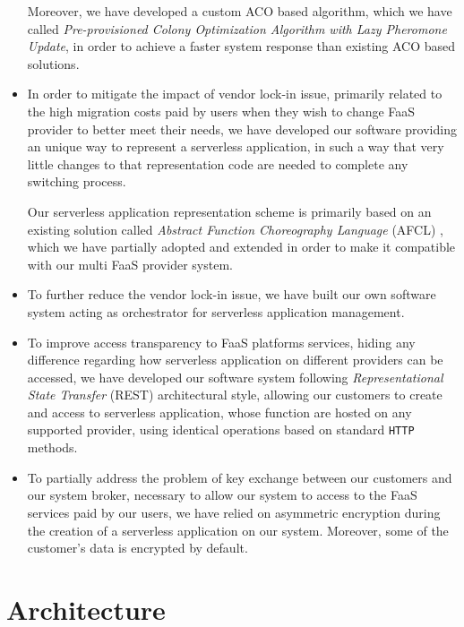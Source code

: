 \documentclass[12pt,a4paper]{report}
\begin{document}
\begin{itemize}
	Moreover, we have developed a custom ACO based algorithm, which we have called \textit{Pre-provisioned Colony Optimization Algorithm with Lazy Pheromone Update}, in order to achieve a faster system response than existing ACO based solutions.
	
	\item In order to mitigate the impact of vendor lock-in issue, primarily related to the high migration costs paid by users when they wish to change FaaS provider to better meet their needs, we have developed our software providing an unique way to represent a serverless application, in such a way that very little changes to that representation code are needed to complete any switching process. 
	
	Our serverless application representation scheme is primarily based on an existing solution called \textit{Abstract Function Choreography Language} (AFCL) \cite{AFCL}, which we have partially adopted and extended in order to make it compatible with our multi FaaS provider system. 
	
	\item To further reduce the vendor lock-in issue, we have built our own software system acting as orchestrator for serverless application management.
	
	\item To improve access transparency to FaaS platforms services, hiding any difference regarding how serverless application on different providers can be accessed, we have developed our software system following \textit{Representational State Transfer} (REST) architectural style, allowing our customers to create and access to serverless application, whose function are hosted on any supported provider, using identical operations based on standard \texttt{HTTP} methods.
	
	\item To partially address the problem of key exchange between our customers and our system broker, necessary to allow our system to access to the FaaS services paid by our users, we have relied on asymmetric encryption during the creation of a serverless application on our system. Moreover, some of the customer's data is encrypted by default.
	
\end{itemize}

\chapter{Architecture}
\end{document}
